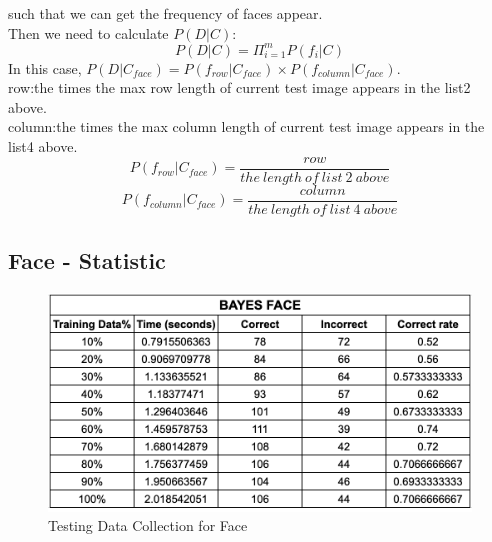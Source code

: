 \documentclass[11pt]{report}
\begin{document}
such that we can get the frequency of faces appear. \\

Then we need to calculate $P(D|C)$: \\
$$P(D|C) = \Pi_{i=1}^m P(f_i|C)$$
In this case, $P(D|C_{face}) = P(f_{row}|C_{face})  \times P(f_{column}|C_{face}) $. \\

\noindent row:the times the max row length of current test image appears in the list2 above.\\
column:the times the max column length of current test image appears in the list4 above.
$$P(f_{row}|C_{face}) = \frac{row}{the\ length\ of\ list\ 2\ above}$$
$$P(f_{column}|C_{face}) = \frac{column}{the\ length\ of\ list\ 4\ above}$$

\newpage

\subsection*{Face - Statistic}

\begin{figure}[h]
\begin{center}
\includegraphics[scale=0.5]{Bayes_face_statistic.png} 
\end{center}
\caption{Testing Data Collection for Face}
\end{figure}
\end{document}
